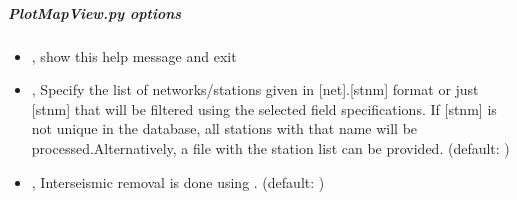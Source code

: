 \documentclass[letterpaper,10pt,english]{sphinxmanual}
\begin{document}
\subparagraph{PlotMapView.py options}
\label{\detokenize{pgamit.com:PlotMapView.py-options}}\begin{itemize}
\item {} 
\sphinxAtStartPar
{\hyperref[\detokenize{pgamit.com:PlotMapView.py--h}]{}}, {\hyperref[\detokenize{pgamit.com:PlotMapView.py---help}]{}} \sphinxhyphen{} show this help message and exit

\item {} 
\sphinxAtStartPar
{\hyperref[\detokenize{pgamit.com:PlotMapView.py--stn}]{}} , {\hyperref[\detokenize{pgamit.com:PlotMapView.py---stations}]{}}  \sphinxhyphen{} Specify the list of networks/stations given in {[}net{]}.{[}stnm{]} format or just {[}stnm{]} that will be filtered using the selected field specifications. If {[}stnm{]} is not unique in the database, all stations with that name will be processed.Alternatively, a file with the station list can be provided. (default: \sphinxcode{\sphinxupquote{{[}{]}}})

\item {} 
\sphinxAtStartPar
{\hyperref[\detokenize{pgamit.com:PlotMapView.py--inter}]{}} , {\hyperref[\detokenize{pgamit.com:PlotMapView.py---interseismic_model}]{}}  \sphinxhyphen{} Interseismic removal is done using . (default: )


\end{itemize}
\end{document}
